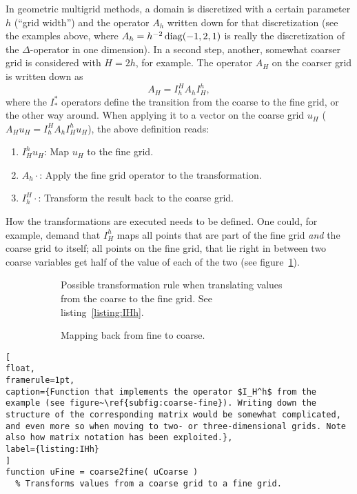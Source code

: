 \begin{example}[Multigrid]
In geometric multigrid methods, a domain is discretized with a certain
parameter $h$ (``grid width'') and the operator $A_h$ written down for that
discretization (see the examples above, where $A_h=h^{-2}\operatorname{diag}(-1,2,1)$ is
really the discretization of the $\Delta$-operator in one dimension). In a
second step, another, somewhat coarser grid is considered with $H=2h$, for
example. The operator $A_H$ on the coarser grid is written down as
\[
A_H = I_h^H A_h I_H^h,
\]
where the $I_*^*$ operators define the transition from the coarse to the fine
grid, or the other way around. When applying it to a vector on the coarse grid
$u_H$ ($A_Hu_H =I_h^H A_h I_H^h u_H$), the above definition reads:
\begin{enumerate}
\item $I_H^h u_H$: Map $u_H$ to the fine grid.
\item $A_h\cdot$: Apply the fine grid operator to the transformation.
\item $I_h^H\cdot$: Transform the result back to the coarse grid.
\end{enumerate}
How the transformations are executed needs to be defined. One could, for
example, demand that $I_H^h$ maps all points that are part of the fine grid
\emph{and} the coarse grid to itself; all points on the fine grid, that lie
right in between two coarse variables get half of the value of each of the two
(see figure~\ref{subfig:coarse-fine}).

\begin{figure}
\centering
\begin{subfigure}{0.45\textwidth}
  
  \caption{Possible transformation rule when translating values from the
  coarse to the fine grid. See listing~\ref{listing:IHh}.}
  \label{subfig:coarse-fine}
\end{subfigure}
\hfill
\begin{subfigure}{0.45\textwidth}
  
  \caption{Mapping back from fine to coarse.}
  \label{subfig:fine-coarse}
\end{subfigure}
\caption{}
\end{figure}


\begin{lstlisting}[
float,
framerule=1pt,
caption={Function that implements the operator $I_H^h$ from the example (see figure~\ref{subfig:coarse-fine}). Writing down the structure of the corresponding matrix would be somewhat complicated, and even more so when moving to two- or three-dimensional grids. Note also how matrix notation has been exploited.},
label={listing:IHh}
]
function uFine = coarse2fine( uCoarse )
  % Transforms values from a coarse grid to a fine grid.


\end{lstlisting}
\end{example}
